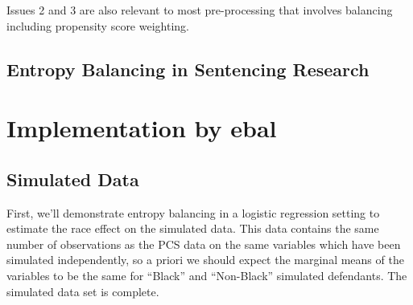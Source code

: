 \documentclass[
  letterpaper,
  DIV=11,
  numbers=noendperiod]{scrartcl}
\begin{document}
Issues 2 and 3 are also relevant to most pre-processing that involves
balancing including propensity score weighting.

\hypertarget{entropy-balancing-in-sentencing-research}{%
\subsection{Entropy Balancing in Sentencing
Research}\label{entropy-balancing-in-sentencing-research}}

\hypertarget{implementation-by-ebal}{%
\section{Implementation by ebal}\label{implementation-by-ebal}}

\hypertarget{simulated-data}{%
\subsection{Simulated Data}\label{simulated-data}}

First, we'll demonstrate entropy balancing in a logistic regression
setting to estimate the race effect on the simulated data. This data
contains the same number of observations as the PCS data on the same
variables which have been simulated independently, so a priori we should
expect the marginal means of the variables to be the same for ``Black''
and ``Non-Black'' simulated defendants. The simulated data set is
complete.
\end{document}
